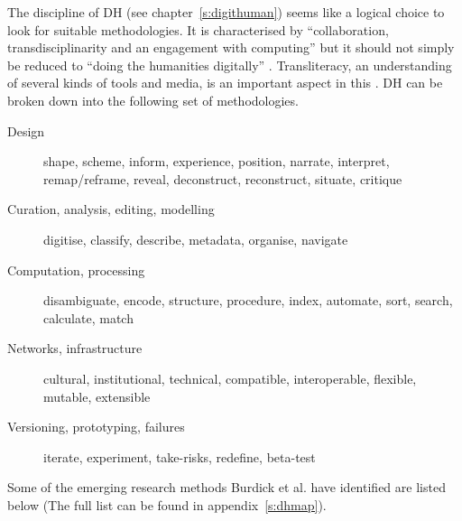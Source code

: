 The discipline of \acf{DH} (see chapter~\ref{s:digithuman}) seems like a logical choice to look for suitable methodologies. It is characterised by ``collaboration, transdisciplinarity and an engagement with computing'' \autocite{Burdick2012} but it should not simply be reduced to ``doing the humanities digitally'' \autocite*{Burdick2012}. Transliteracy, an understanding of several kinds of tools and media, is an important aspect in this \autocite{Thomas2007}. \ac{DH} can be broken down into the following set of methodologies.

\begin{description}
  \item [Design] shape, scheme, inform, experience, position, narrate,
  					interpret, remap/reframe, reveal, deconstruct, reconstruct,
  					situate, critique
  \item [Curation, analysis, editing, modelling] digitise, classify, describe, metadata, organise, navigate
  \item [Computation, processing] disambiguate, encode, structure, procedure, index, automate, sort, search, calculate, match
  \item [Networks, infrastructure] cultural, institutional, technical, compatible, interoperable, flexible, mutable, extensible
  \item [Versioning, prototyping, failures]	iterate, experiment, take-risks, redefine, beta-test
\end{description}

Some of the emerging research methods Burdick et al. have identified are listed below \autocite*{Burdick2012} (The full list can be found in appendix~\ref{s:dhmap}).

